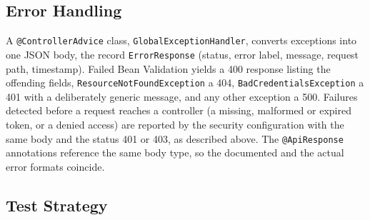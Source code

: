 \subsection{Error Handling}\label{sec:impl-errors}

A \texttt{@ControllerAdvice} class, \texttt{GlobalExceptionHandler}, converts exceptions into one JSON body, the record \texttt{ErrorResponse} (status, error label, message, request path, timestamp). Failed Bean Validation yields a 400 response listing the offending fields, \texttt{ResourceNotFoundException} a 404, \texttt{BadCredentialsException} a 401 with a deliberately generic message, and any other exception a 500. Failures detected before a request reaches a controller (a missing, malformed or expired token, or a denied access) are reported by the security configuration with the same body and the status 401 or 403, as described above. The \texttt{@ApiResponse} annotations reference the same body type, so the documented and the actual error formats coincide.

\subsection{Test Strategy}

